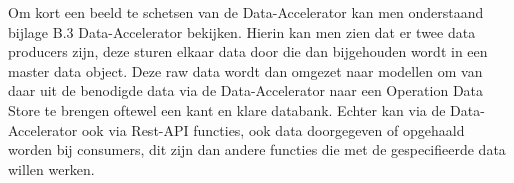 Om kort een beeld te schetsen van de Data-Accelerator kan men onderstaand bijlage B.3 Data-Accelerator bekijken. Hierin kan men zien dat er twee data producers zijn, deze sturen elkaar data door die dan bijgehouden wordt in een master data object. Deze raw data wordt dan omgezet naar modellen om van daar uit de benodigde data via de Data-Accelerator naar een Operation Data Store te brengen oftewel een kant en klare databank. Echter kan via de Data-Accelerator ook via Rest-API functies, ook data doorgegeven of opgehaald worden bij consumers, dit zijn dan andere functies die met de gespecifieerde data willen werken.